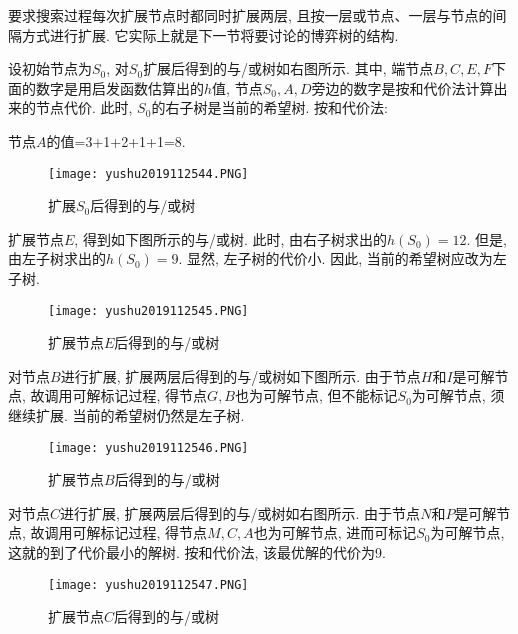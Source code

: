 \begin{remark}
要求搜索过程每次扩展节点时都同时扩展两层, 且按一层或节点、一层与节点的间隔方式进行扩展. 它实际上就是下一节将要讨论的博弈树的结构.
\end{remark}

设初始节点为$S_0$, 对$S_0$扩展后得到的与/或树如右图所示. 其中, 端节点$B,C,E,F$下面的数字是用启发函数估算出的$h$值, 节点$S_0,A,D$旁边的数字是按和代价法计算出来的节点代价.
此时, $S_0$的右子树是当前的希望树. 按和代价法:
\begin{example}
  节点$A$的值=3+1+2+1+1=8.
\begin{figure}[H]
  \centering
  \texttt{[image: yushu2019112544.PNG]}
  \caption{扩展$S_0$后得到的与/或树}
  \label{AI32fig44}
\end{figure}
\end{example}


扩展节点$E$, 得到如下图所示的与/或树.
此时, 由右子树求出的$h(S_0)=12$. 但是, 由左子树求出的$h(S_0)=9$. 显然, 左子树的代价小. 因此, 当前的希望树应改为左子树.
\begin{figure}[H]
\centering
\texttt{[image: yushu2019112545.PNG]}
\caption{扩展节点$E$后得到的与/或树}
\label{AI32fig45}
\end{figure}
对节点$B$进行扩展, 扩展两层后得到的与/或树如下图所示. 由于节点$H$和$I$是可解节点, 故调用可解标记过程, 得节点$G,B$也为可解节点, 但不能标记$S_0$为可解节点, 须继续扩展. 当前的希望树仍然是左子树.
\begin{figure}[H]
\centering
\texttt{[image: yushu2019112546.PNG]}
\caption{扩展节点$B$后得到的与/或树}
\label{AI32fig46}
\end{figure}
对节点$C$进行扩展, 扩展两层后得到的与/或树如右图所示. 由于节点$N$和$P$是可解节点, 故调用可解标记过程, 得节点$M,C,A$也为可解节点, 进而可标记$S_0$为可解节点, 这就的到了代价最小的解树. 按和代价法, 该最优解的代价为9.
\begin{figure}[H]
\centering
\texttt{[image: yushu2019112547.PNG]}
\caption{扩展节点$C$后得到的与/或树}
\label{AI32fig47}
\end{figure}
